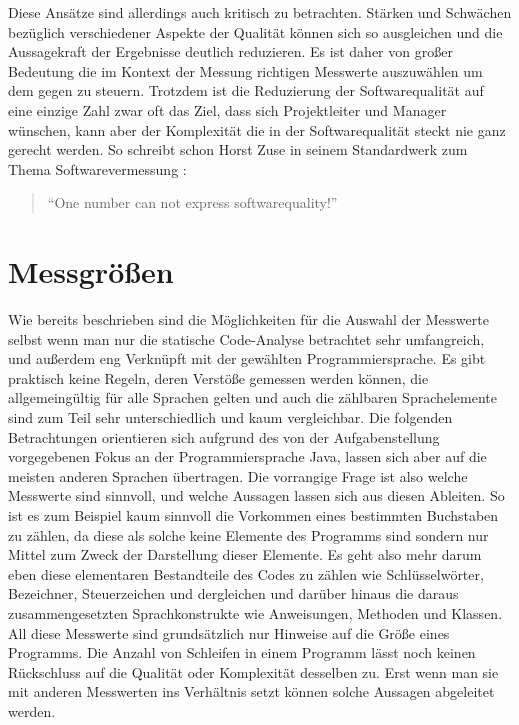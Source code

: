 \documentclass[gb,ngerman]{stthesis}
\begin{document}
  		Diese Ansätze sind allerdings auch kritisch zu betrachten. Stärken und Schwächen bezüglich verschiedener Aspekte der Qualität können sich so  ausgleichen und die Aussagekraft der Ergebnisse deutlich reduzieren. Es ist daher von großer Bedeutung die im Kontext der Messung richtigen Messwerte auszuwählen um dem gegen zu steuern. Trotzdem ist die Reduzierung der Softwarequalität auf eine einzige Zahl zwar oft das Ziel, dass sich Projektleiter und Manager wünschen, kann aber der Komplexität die in der Softwarequalität steckt nie ganz gerecht werden. So schreibt schon Horst Zuse in seinem Standardwerk zum Thema Softwarevermessung \cite{FrameworkSoftwareMeasurement}:
  		\begin{quote}
  			"`One number can not express softwarequality!"'
  		\end{quote}
     \section{Messgrößen}
       Wie bereits beschrieben sind die Möglichkeiten für die Auswahl der Messwerte selbst wenn man nur die statische Code-Analyse betrachtet sehr umfangreich, und außerdem eng Verknüpft mit der gewählten Programmiersprache. Es gibt praktisch keine Regeln, deren Verstöße gemessen werden können, die allgemeingültig für alle Sprachen gelten und auch die zählbaren Sprachelemente sind zum Teil sehr unterschiedlich und kaum vergleichbar. Die folgenden Betrachtungen orientieren sich aufgrund des von der Aufgabenstellung vorgegebenen Fokus an der Programmiersprache Java, lassen sich aber auf die meisten anderen Sprachen übertragen.\newline
       Die vorrangige Frage ist also welche Messwerte sind sinnvoll, und welche Aussagen lassen sich aus diesen Ableiten. So ist es zum Beispiel kaum sinnvoll die Vorkommen eines bestimmten Buchstaben zu zählen, da diese als solche keine Elemente des Programms sind sondern nur Mittel zum Zweck der Darstellung dieser Elemente. Es geht also mehr darum eben diese elementaren Bestandteile des Codes zu zählen wie Schlüsselwörter, Bezeichner, Steuerzeichen und dergleichen und darüber hinaus die daraus zusammengesetzten Sprachkonstrukte wie Anweisungen, Methoden und Klassen. All diese Messwerte sind grundsätzlich nur Hinweise auf die Größe eines Programms. Die Anzahl von Schleifen in einem Programm lässt noch keinen Rückschluss auf die Qualität oder Komplexität desselben zu. Erst wenn man sie mit anderen Messwerten ins Verhältnis setzt können solche Aussagen abgeleitet werden. \newline
\end{document}
